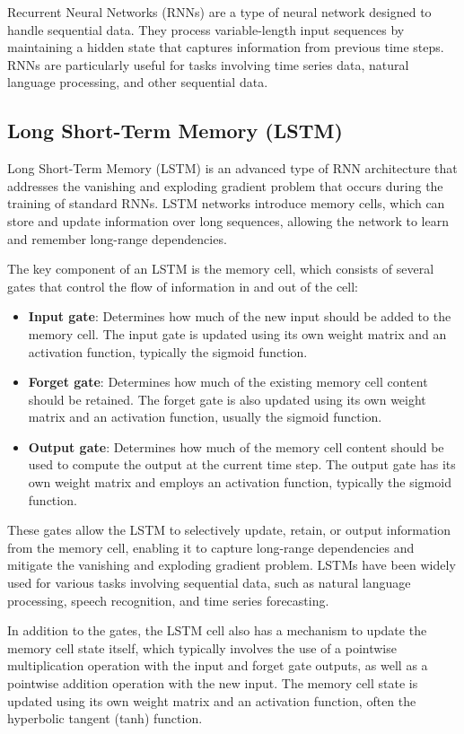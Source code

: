 \documentclass[12pt]{article}
\begin{document}
Recurrent Neural Networks (RNNs) are a type of neural network designed to handle sequential data. They process variable-length input sequences by maintaining a hidden state that captures information from previous time steps. RNNs are particularly useful for tasks involving time series data, natural language processing, and other sequential data.

\subsection{Long Short-Term Memory (LSTM)}

Long Short-Term Memory (LSTM) is an advanced type of RNN architecture that addresses the vanishing and exploding gradient problem that occurs during the training of standard RNNs. LSTM networks introduce memory cells, which can store and update information over long sequences, allowing the network to learn and remember long-range dependencies.

The key component of an LSTM is the memory cell, which consists of several gates that control the flow of information in and out of the cell:

\begin{itemize}
\item \textbf{Input gate}: Determines how much of the new input should be added to the memory cell. The input gate is updated using its own weight matrix and an activation function, typically the sigmoid function.
\item \textbf{Forget gate}: Determines how much of the existing memory cell content should be retained. The forget gate is also updated using its own weight matrix and an activation function, usually the sigmoid function.
\item \textbf{Output gate}: Determines how much of the memory cell content should be used to compute the output at the current time step. The output gate has its own weight matrix and employs an activation function, typically the sigmoid function.
\end{itemize}

These gates allow the LSTM to selectively update, retain, or output information from the memory cell, enabling it to capture long-range dependencies and mitigate the vanishing and exploding gradient problem. LSTMs have been widely used for various tasks involving sequential data, such as natural language processing, speech recognition, and time series forecasting.

In addition to the gates, the LSTM cell also has a mechanism to update the memory cell state itself, which typically involves the use of a pointwise multiplication operation with the input and forget gate outputs, as well as a pointwise addition operation with the new input. The memory cell state is updated using its own weight matrix and an activation function, often the hyperbolic tangent (tanh) function.
\end{document}
